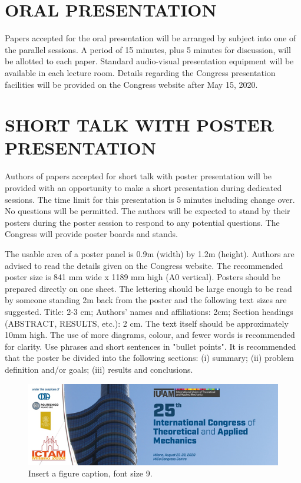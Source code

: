 \documentclass[10pt, a4paper]{article}
\begin{document}
\section{ORAL PRESENTATION}

Papers accepted for the oral presentation will be arranged by subject into one of the parallel sessions. A period of 15 minutes, plus 5 minutes for discussion, will be allotted to each paper. Standard audio-visual presentation equipment will be available in each lecture room. Details regarding the Congress presentation facilities will be provided on the Congress website after May 15, 2020.

\section{SHORT TALK WITH POSTER PRESENTATION }
  Authors of papers accepted for short talk with poster presentation will be provided with an opportunity to make a short presentation during dedicated sessions. The time limit for this presentation is 5 minutes including change over. No questions will be permitted. The authors will be expected to stand by their posters during the poster session to respond to any potential questions. The Congress will provide poster boards and stands.
  
The usable area of a poster panel is 0.9m (width) by 1.2m (height). Authors are advised to read the details given on the Congress website. The recommended poster size is 841 mm wide x 1189 mm high (A0 vertical). Posters should be prepared directly on one sheet. The lettering should be large enough to be read by someone standing 2m back from the poster and the following text sizes are suggested. Title: 2-3 cm; Authors' names and affiliations: 2cm; Section headings (ABSTRACT, RESULTS, etc.): 2 cm. The text itself should be approximately 10mm high. The use of more diagrams, colour, and fewer words is recommended for clarity. Use phrases and short sentences in "bullet points". It is recommended that the poster be divided into the following sections: (i) summary; (ii) problem definition and/or goals; (iii) results and conclusions.


\begin{figure}[!t]
\centering
\includegraphics[width=6 in]{Figure.png}
\caption{\fontsize{9}{9}\selectfont Insert a figure caption, font size 9.}
\label{Fig1}
\end{figure}
\end{document}

